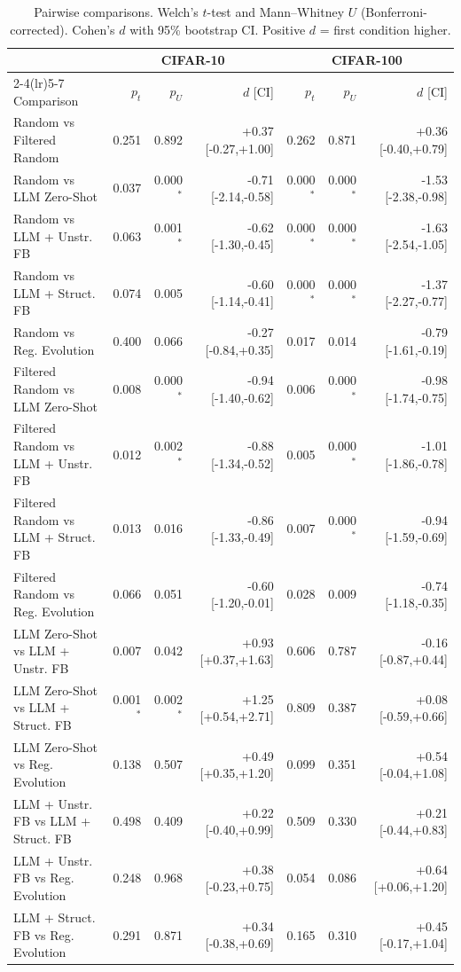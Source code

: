 \begin{table}[t]
\centering\small
\caption{Pairwise comparisons. Welch's $t$-test and Mann--Whitney $U$ (Bonferroni-corrected). Cohen's $d$ with 95\% bootstrap CI. Positive $d$ = first condition higher.}
\label{tab:stats}
\begin{tabular}{@{}l rrr rrr@{}}
\toprule
& \multicolumn{3}{c}{CIFAR-10} & \multicolumn{3}{c}{CIFAR-100} \\
\cmidrule(lr){2-4}\cmidrule(lr){5-7}
Comparison & $p_t$ & $p_U$ & $d$ [CI] & $p_t$ & $p_U$ & $d$ [CI] \\
\midrule
Random vs Filtered Random & 0.251 & 0.892 & +0.37 [-0.27,+1.00] & 0.262 & 0.871 & +0.36 [-0.40,+0.79] \\
Random vs LLM Zero-Shot & 0.037 & 0.000$^{*}$ & -0.71 [-2.14,-0.58] & 0.000$^{*}$ & 0.000$^{*}$ & -1.53 [-2.38,-0.98] \\
Random vs LLM + Unstr. FB & 0.063 & 0.001$^{*}$ & -0.62 [-1.30,-0.45] & 0.000$^{*}$ & 0.000$^{*}$ & -1.63 [-2.54,-1.05] \\
Random vs LLM + Struct. FB & 0.074 & 0.005 & -0.60 [-1.14,-0.41] & 0.000$^{*}$ & 0.000$^{*}$ & -1.37 [-2.27,-0.77] \\
Random vs Reg. Evolution & 0.400 & 0.066 & -0.27 [-0.84,+0.35] & 0.017 & 0.014 & -0.79 [-1.61,-0.19] \\
Filtered Random vs LLM Zero-Shot & 0.008 & 0.000$^{*}$ & -0.94 [-1.40,-0.62] & 0.006 & 0.000$^{*}$ & -0.98 [-1.74,-0.75] \\
Filtered Random vs LLM + Unstr. FB & 0.012 & 0.002$^{*}$ & -0.88 [-1.34,-0.52] & 0.005 & 0.000$^{*}$ & -1.01 [-1.86,-0.78] \\
Filtered Random vs LLM + Struct. FB & 0.013 & 0.016 & -0.86 [-1.33,-0.49] & 0.007 & 0.000$^{*}$ & -0.94 [-1.59,-0.69] \\
Filtered Random vs Reg. Evolution & 0.066 & 0.051 & -0.60 [-1.20,-0.01] & 0.028 & 0.009 & -0.74 [-1.18,-0.35] \\
LLM Zero-Shot vs LLM + Unstr. FB & 0.007 & 0.042 & +0.93 [+0.37,+1.63] & 0.606 & 0.787 & -0.16 [-0.87,+0.44] \\
LLM Zero-Shot vs LLM + Struct. FB & 0.001$^{*}$ & 0.002$^{*}$ & +1.25 [+0.54,+2.71] & 0.809 & 0.387 & +0.08 [-0.59,+0.66] \\
LLM Zero-Shot vs Reg. Evolution & 0.138 & 0.507 & +0.49 [+0.35,+1.20] & 0.099 & 0.351 & +0.54 [-0.04,+1.08] \\
LLM + Unstr. FB vs LLM + Struct. FB & 0.498 & 0.409 & +0.22 [-0.40,+0.99] & 0.509 & 0.330 & +0.21 [-0.44,+0.83] \\
LLM + Unstr. FB vs Reg. Evolution & 0.248 & 0.968 & +0.38 [-0.23,+0.75] & 0.054 & 0.086 & +0.64 [+0.06,+1.20] \\
LLM + Struct. FB vs Reg. Evolution & 0.291 & 0.871 & +0.34 [-0.38,+0.69] & 0.165 & 0.310 & +0.45 [-0.17,+1.04] \\
\bottomrule
\end{tabular}
\end{table}